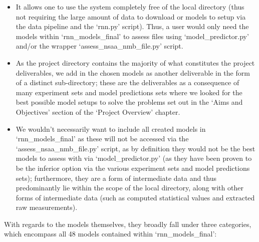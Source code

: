 \documentclass[12pt,twoside]{report}
\begin{document}
\begin{itemize}
	\item It allows one to use the system completely free of the local directory (thus not requiring the large amount of data to download or models to setup via the data pipeline and the ‘rnn.py’ script). Thus, a user would only need the models within ‘rnn\_models\_final’ to assess files using ‘model\_predictor.py’ and/or the wrapper ‘assess\_nsaa\_nmb\_file.py’ script.
	\item As the project directory contains the majority of what constitutes the project deliverables, we add in the chosen models as another deliverable in the form of a distinct sub-directory; these are the deliverables as a consequence of many experiment sets and model predictions sets where we looked for the best possible model setups to solve the problems set out in the ‘Aims and Objectives’ section of the ‘Project Overview’ chapter.
	\item We wouldn’t necessarily want to include all created models in ‘rnn\_models\_final’ as these will not be accessed via the ‘assess\_nsaa\_nmb\_file.py’ script, as by definition they would not be the best models to assess with via ‘model\_predictor.py’ (as they have been proven to be the inferior option via the various experiment sets and model predictions sets); furthermore, they are a form of intermediate data and thus predominantly lie within the scope of the local directory, along with other forms of intermediate data (such as computed statistical values and extracted raw measurements).
\end{itemize}

\quad With regards to the models themselves, they broadly fall under three categories, which encompass all 48 models contained within ‘rnn\_models\_final’:
\end{document}
